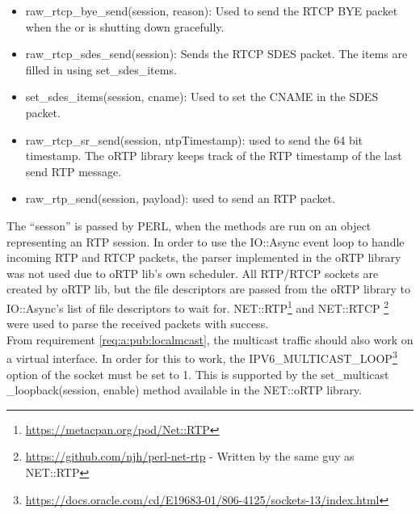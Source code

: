 \begin{itemize}
	\item raw\_rtcp\_bye\_send(session, reason): Used to send the RTCP BYE packet when the \pub{} or \sub{} is shutting down gracefully.
	\item raw\_rtcp\_sdes\_send(session): Sends the RTCP SDES packet. The items are filled in using set\_sdes\_items.
	\item set\_sdes\_items(session, cname): Used to set the \ac{CNAME} in the SDES packet.
	\item raw\_rtcp\_sr\_send(session, ntpTimestamp): used to send the 64 bit timestamp. The oRTP library keeps track of the RTP timestamp of the last send RTP message.
	\item raw\_rtp\_send(session, payload): used to send an RTP packet.
\end{itemize}
The ``sesson'' is passed by PERL, when the methods are run on an object representing an RTP session. In order to use the IO::Async event loop to handle incoming RTP and RTCP packets, the parser implemented in the oRTP library was not used due to oRTP lib's own scheduler. All RTP/RTCP sockets are created by oRTP lib, but the file descriptors are passed from the oRTP library to IO::Async's list of file descriptors to wait for.  NET::RTP\footnote{\url{https://metacpan.org/pod/Net::RTP}} and NET::RTCP \footnote{\url{https://github.com/njh/perl-net-rtp} - Written by the same guy as NET::RTP} were used to parse the received packets with success.\\

\noindent{}From requirement \ref{req:a:pub:localmcast}, the multicast traffic should also work on a virtual interface. In order for this to work, the IPV6\_MULTICAST\_LOOP\footnote{\url{https://docs.oracle.com/cd/E19683-01/806-4125/sockets-13/index.html}} option of the socket must be set to 1. This is supported by the set\_multicast \_loopback(session, enable) method available in the NET::oRTP library.



